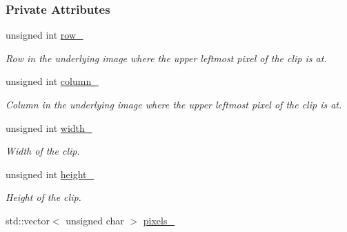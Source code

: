 \subsubsection*{Private Attributes}
\begin{CompactItemize}
\item 
\hypertarget{class_clip_5941d987375ec246785b4688705f44f1}{
unsigned int \hyperlink{class_clip_5941d987375ec246785b4688705f44f1}{row\_\-}}
\label{class_clip_5941d987375ec246785b4688705f44f1}

\begin{CompactList}\small\item\em Row in the underlying image where the upper leftmost pixel of the clip is at. \item\end{CompactList}\item 
\hypertarget{class_clip_9539a222508d1f6ff514c8aa705fd0c2}{
unsigned int \hyperlink{class_clip_9539a222508d1f6ff514c8aa705fd0c2}{column\_\-}}
\label{class_clip_9539a222508d1f6ff514c8aa705fd0c2}

\begin{CompactList}\small\item\em Column in the underlying image where the upper leftmost pixel of the clip is at. \item\end{CompactList}\item 
\hypertarget{class_clip_ba0048c33d63c40629e568d301f64f59}{
unsigned int \hyperlink{class_clip_ba0048c33d63c40629e568d301f64f59}{width\_\-}}
\label{class_clip_ba0048c33d63c40629e568d301f64f59}

\begin{CompactList}\small\item\em Width of the clip. \item\end{CompactList}\item 
\hypertarget{class_clip_eac813b06cee742c237240d9b7ccc336}{
unsigned int \hyperlink{class_clip_eac813b06cee742c237240d9b7ccc336}{height\_\-}}
\label{class_clip_eac813b06cee742c237240d9b7ccc336}

\begin{CompactList}\small\item\em Height of the clip. \item\end{CompactList}\item 
\hypertarget{class_clip_54f166ae724cecf9473d2836b452e89c}{
std::vector$<$ unsigned char $>$ \hyperlink{class_clip_54f166ae724cecf9473d2836b452e89c}{pixels\_\-}}
\label{class_clip_54f166ae724cecf9473d2836b452e89c}


\end{CompactItemize}

